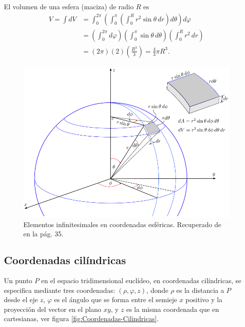 \begin{ejemplo}
    El volumen de una esfera (maciza) de radio $R$ es 
    \begin{align*}
        V = \int dV &= \int_0^{2\pi} \left( \int_0^{\pi} \left( \int_0^R r^2 \sin \theta \,dr \right)d\theta \right) d\varphi \\
        &= \left( \int_0^{2\pi} d\varphi\right) \left(\int_0^{\pi} \sin \theta \,d\theta \right) \left(\int_0^R r^2 \,dr \right) \\
        &= (2\pi) (2) \left(\frac{R^3}{3} \right) = \frac{4}{3} \pi R^3.
    \end{align*}
\end{ejemplo}

\begin{figure}[H]
    \centering
    \includegraphics[scale = 0.5]{Figuras/volumenesfericas.png}
    \caption{Elementos infinitesimales en coordenadas esféricas. Recuperado de \cite{Alvarez} en la pág. 35.}
    \label{fig:Vol-Esfericas}
\end{figure}

\subsection{Coordenadas cilíndricas}

Un punto $P$ en el espacio tridimensional euclídeo, en coordenadas cilíndricas, se especifica mediante tres coordenadas: $(\rho, \varphi, z)$, donde $\rho$ es la distancia a $P$ desde el eje $z$, $\varphi$ es el ángulo que se forma entre el semieje $x$ positivo y la proyección del vector en el plano $xy$, y $z$ es la misma coordenada que en cartesianas, ver figura \ref{fig:Coordenadas-Cilindricas}.

